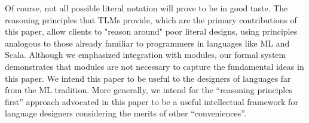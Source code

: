 \documentclass[acmsmall]{acmart}
\newcommand{\li}[1]{\lstinline[basicstyle=\ttfamily\fontsize{9pt}{1em}\selectfont]{#1}}
\begin{document}
Of course, not all possible literal notation will prove to be in good taste. %
The reasoning principles that TLMs provide, which are the primary contributions of this paper, allow clients to "reason around" poor literal designs, using principles analogous to those already familiar to programmers in languages like ML and Scala. Although we emphasized integration with modules, our formal system demonstrates that modules are not necessary to capture the fundamental ideas in this paper. We intend this paper to be useful to the designers of languages far from the ML tradition. More generally, we intend for the ``reasoning principles first'' approach advocated in this paper to be a useful intellectual framework for language designers considering the merits of other ``conveniences''. %


\end{document}
